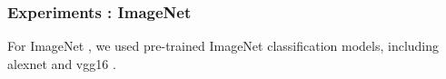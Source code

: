 \begin{frame}
  \frametitle{Experiments : ImageNet}

For ImageNet \citep{Imagenet-old}, we used pre-trained ImageNet classification models, including alexnet \citep{alexnet} and vgg16 \citep{simonyan2014very}.







\end{frame}
